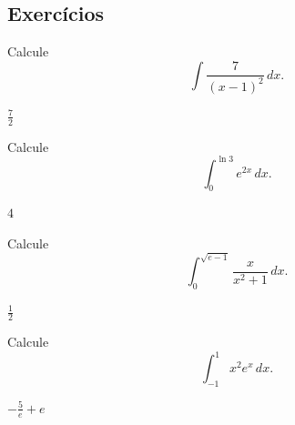 \emconstrucao

\subsection*{Exercícios}

\begin{exer}
  Calcule
  \begin{equation}
    \int \frac{7}{(x-1)^2}\,dx.
  \end{equation}
\end{exer}
\begin{resp}
  $\frac{7}{2}$
\end{resp}

\begin{exer}
  Calcule
  \begin{equation}
    \int_0^{\ln 3} e^{2x}\,dx.
  \end{equation}
\end{exer}
\begin{resp}
  $4$
\end{resp}

\begin{exer}
  Calcule
  \begin{equation}
    \int_0^{\sqrt{e-1}} \frac{x}{x^2+1}\,dx.
  \end{equation}
\end{exer}
\begin{resp}
  $\frac{1}{2}$
\end{resp}

\begin{exer}
  Calcule
  \begin{equation}
    \int_{-1}^1 x^2e^x\,dx.
  \end{equation}
\end{exer}
\begin{resp}
  $-\frac{5}{e}+e$
\end{resp}

